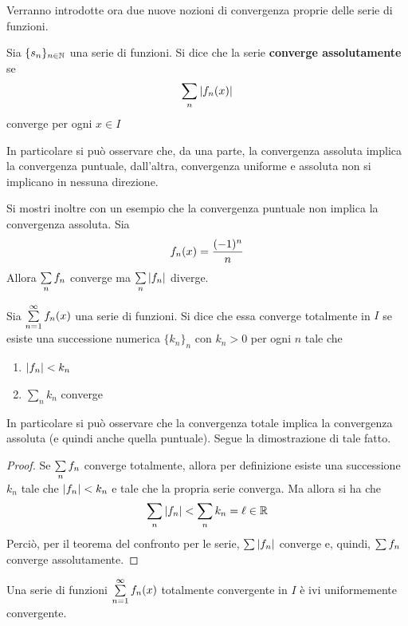 Verranno introdotte ora due nuove nozioni di convergenza proprie delle serie di funzioni.
\begin{definition}
    Sia $\{s_n\}_{n \in \mathbb{N}}$ una serie di funzioni. Si dice che la serie \textbf{converge assolutamente}  se
    \begin{equation}
        \sum_{n}{|f_n(x)|}
    \end{equation}
    converge per ogni $x \in I$
\end{definition}
In particolare si può osservare che, da una parte, la convergenza assoluta implica la convergenza puntuale, dall'altra, convergenza uniforme e assoluta non si implicano in nessuna direzione.
\begin{example}
    Si mostri inoltre con un esempio che la convergenza puntuale non implica la convergenza assoluta. Sia
    \begin{equation*}
        f_n(x)=\frac{(-1)^n}{n}
    \end{equation*}
    Allora $\sum\limits_{n}{f_n}$ converge ma $\sum\limits_{n}{|f_n|}$ diverge.
\end{example}
\begin{definition}
    Sia $\sum\limits_{n=1}^{\infty}{f_n(x)}$ una serie di funzioni. Si dice che essa converge totalmente in $I$ se esiste una successione numerica $\{k_n\}_n$ con $k_n>0$ per ogni $n$ tale che
    \begin{enumerate}
        \item $|f_n|<k_n$
        \item $\sum\limits_{n}{k_n}$ converge
    \end{enumerate}
\end{definition}
In particolare si può osservare che la convergenza totale implica la convergenza assoluta (e quindi anche quella puntuale). Segue la dimostrazione di tale fatto.
\begin{proof}
    Se $\sum\limits_{n}f_n$ converge totalmente, allora per definizione esiste una successione $k_n$ tale che $|f_n|<k_n$ e tale che la propria serie converga. Ma allora si ha che
    \begin{equation}
        \sum_{n}{|f_n|} < \sum_{n}{k_n}= \ell \in \mathbb{R}
    \end{equation}
    Perciò, per il teorema del confronto per le serie, $\sum\limits{|f_n|}$ converge e, quindi, $\sum\limits{f_n}$ converge assolutamente.
\end{proof}
\begin{theorem} \label{Teo: Criterio di Weierstrass (convergenza totale)}
Una serie di funzioni $\sum\limits_{n=1}^{\infty}{f_n(x)}$ totalmente convergente in $I$ è ivi uniformemente convergente.
\end{theorem}
